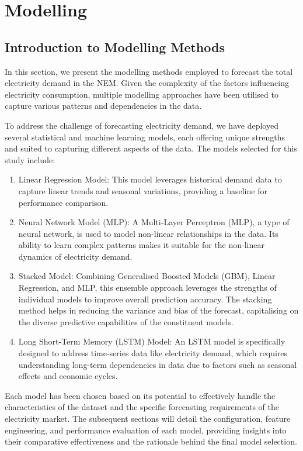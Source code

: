\documentclass[
]{article}
\providecommand{\tightlist}{%
  \setlength{\itemsep}{0pt}\setlength{\parskip}{0pt}}
\begin{document}
\section{Modelling}\label{modelling}

\subsection{Introduction to Modelling
Methods}\label{introduction-to-modelling-methods}

In this section, we present the modelling methods employed to forecast
the total electricity demand in the NEM. Given the complexity of the
factors influencing electricity consumption, multiple modelling
approaches have been utilised to capture various patterns and
dependencies in the data.

To address the challenge of forecasting electricity demand, we have
deployed several statistical and machine learning models, each offering
unique strengths and suited to capturing different aspects of the data.
The models selected for this study include:

\begin{enumerate}
\def\labelenumi{\arabic{enumi}.}
\tightlist
\item
  Linear Regression Model: This model leverages historical demand data
  to capture linear trends and seasonal variations, providing a baseline
  for performance comparison.
\item
  Neural Network Model (MLP): A Multi-Layer Perceptron (MLP), a type of
  neural network, is used to model non-linear relationships in the data.
  Its ability to learn complex patterns makes it suitable for the
  non-linear dynamics of electricity demand.
\item
  Stacked Model: Combining Generalised Boosted Models (GBM), Linear
  Regression, and MLP, this ensemble approach leverages the strengths of
  individual models to improve overall prediction accuracy. The stacking
  method helps in reducing the variance and bias of the forecast,
  capitalising on the diverse predictive capabilities of the constituent
  models.
\item
  Long Short-Term Memory (LSTM) Model: An LSTM model is specifically
  designed to address time-series data like electricity demand, which
  requires understanding long-term dependencies in data due to factors
  such as seasonal effects and economic cycles.
\end{enumerate}

Each model has been chosen based on its potential to effectively handle
the characteristics of the dataset and the specific forecasting
requirements of the electricity market. The subsequent sections will
detail the configuration, feature engineering, and performance
evaluation of each model, providing insights into their comparative
effectiveness and the rationale behind the final model selection.
\end{document}

